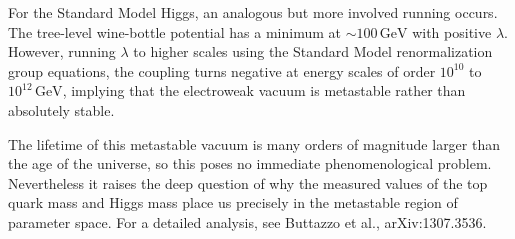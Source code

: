 For the Standard Model Higgs, an analogous but more involved running
occurs. The tree-level wine-bottle potential has a minimum at
$\sim 100\,\text{GeV}$ with positive $\lambda$. However, running $\lambda$
to higher scales using the Standard Model renormalization group equations,
the coupling turns negative at energy scales of order $10^{10}$ to
$10^{12}\,\text{GeV}$, implying that the electroweak vacuum is
metastable rather than absolutely stable.


The lifetime of this metastable vacuum is many orders of magnitude
larger than the age of the universe, so this poses no immediate
phenomenological problem. Nevertheless it raises the deep question of
why the measured values of the top quark mass and Higgs mass place us
precisely in the metastable region of parameter space. For a detailed
analysis, see Buttazzo et al., arXiv:1307.3536.
